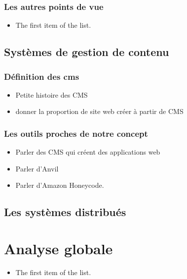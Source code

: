 \documentclass{rapport_stage}
\begin{document}
\subsection*{Les autres points de vue}

\begin{itemize}[label=$\bullet$]
  \item The first item of the list.
\end{itemize}

\section{Systèmes de gestion de contenu}


\subsection*{Définition des \gls{cms}}

\begin{itemize}[label=$\bullet$]
  \item Petite histoire des CMS
  \item donner la proportion de site web créer à partir de CMS
\end{itemize}

\subsection*{Les outils proches de notre concept}

\begin{itemize}[label=$\bullet$]
  \item Parler des CMS qui créent des applications web
  \item Parler d'Anvil
  \item Parler d'Amazon Honeycode.
\end{itemize}

\section{Les systèmes distribués}

\chapter{Analyse globale}

\begin{itemize}[label=$\bullet$]
  \item The first item of the list.
\end{itemize}
\end{document}

